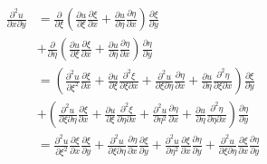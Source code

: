 \documentclass[twoside, 11pt, a4paper]{article}
\begin{document}
\newpage
\[
  \begin{split}
    \frac{\partial^2 u}{\partial x\partial y} &= \frac{\partial}{\partial\xi}\left(\frac{\partial u}{\partial\xi}\frac{\partial \xi}{\partial x} + \frac{\partial u}{\partial\eta}\frac{\partial \eta}{\partial x}\right)\frac{\partial\xi}{\partial y} \\
    &+ \frac{\partial}{\partial\eta}\left(\frac{\partial u}{\partial\xi}\frac{\partial \xi}{\partial x} + \frac{\partial u}{\partial\eta}\frac{\partial \eta}{\partial x}\right)\frac{\partial\eta}{\partial y} \\
    &= \left(\frac{\partial^2u}{\partial\xi^2}\frac{\partial\xi}{\partial x} + \frac{\partial u}{\partial \xi}\frac{\partial^2\xi}{\partial\xi\partial x} + \frac{\partial^2u}{\partial\xi\partial\eta}\frac{\partial\eta}{\partial x} + \frac{\partial u}{\partial\eta}\frac{\partial^2\eta}{\partial\xi\partial x}\right)\frac{\partial\xi}{\partial y} \\
    &+ \left(\frac{\partial^2u}{\partial\xi\partial\eta}\frac{\partial\xi}{\partial x}+\frac{\partial u}{\partial\xi}\frac{\partial^2\xi}{\partial\eta\partial x} + \frac{\partial^2u}{\partial\eta^2}\frac{\partial\eta}{\partial x} + \frac{\partial u}{\partial\eta}\frac{\partial^2\eta}{\partial\eta\partial x}\right)\frac{\partial\eta}{\partial y} \\
    &= \frac{\partial^2u}{\partial\xi^2}\frac{\partial\xi}{\partial x}\frac{\partial\xi}{\partial y} + \frac{\partial^2u}{\partial\xi\partial\eta}\frac{\partial\eta}{\partial x}\frac{\partial\xi}{\partial y}
    + \frac{\partial^2u}{\partial\eta^2}\frac{\partial\xi}{\partial x}\frac{\partial \eta}{\partial y} + \frac{\partial^2 u}{\partial \xi\partial\eta}\frac{\partial\xi}{\partial x}\frac{\partial\eta}{\partial y}
  \end{split}
\]
\end{document}
